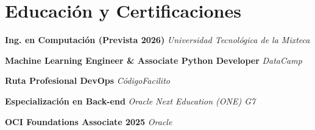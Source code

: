 \documentclass[a4paper,11pt]{article}
\begin{document}
\section*{Educación y Certificaciones}

\textbf{Ing. en Computación (Prevista 2026)} \hfill \textit{Universidad Tecnológica de la Mixteca} \par \vspace{3pt}

\textbf{Machine Learning Engineer \& Associate Python Developer} \hfill \textit{DataCamp} \par \vspace{3pt}

\textbf{Ruta Profesional DevOps} \hfill \textit{CódigoFacilito} \par \vspace{3pt}

\textbf{Especialización en Back-end} \hfill \textit{Oracle Next Education (ONE) G7} \par \vspace{3pt}

\textbf{OCI Foundations Associate 2025} \hfill \textit{Oracle} \par
\end{document}
